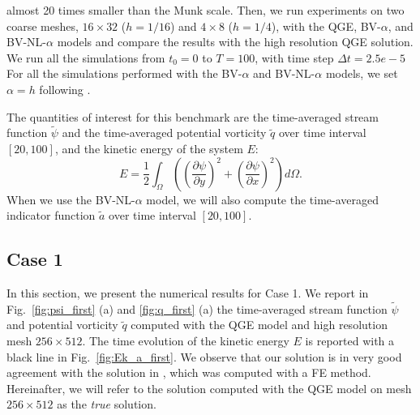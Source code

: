 \documentclass[11pt,a4paper]{article}
\begin{document}
almost 20 times smaller than the Munk scale. Then, we run experiments on two coarse meshes, 
$16 \times 32$ ($h = 1/16$) and $4 \times 8$ ($h = 1/4$), with the QGE, BV-$\alpha$, and BV-NL-$\alpha$ models and 
compare the results with the high resolution QGE solution. %
We run all the simulations from $t_0 = 0$ to $T = 100$, with time step $\Delta t = 2.5e-5$ \cite{San2014}
For all the simulations performed with the BV-$\alpha$ and BV-NL-$\alpha$ models, we  
set $\alpha = h$ following \cite{Holm2003}.

The quantities of interest for this benchmark are the time-averaged stream function $\widetilde{\psi}$
and the time-averaged potential vorticity $\widetilde{q}$ over time interval $[20,100]$, and 
the kinetic energy of the system $E$:
\begin{equation}
E = \dfrac{1}{2}\int_\Omega  \left( \left(\dfrac{\partial \psi}{\partial y}\right)^2 + \left(\dfrac{\partial \psi}{\partial x}\right)^2 \right)d\Omega.
\end{equation}\label{eq:kin_energy}
When we use the BV-NL-$\alpha$ model,
we will also compute the time-averaged indicator function $\widetilde{a}$ over time interval $[20,100]$.


\subsection{Case 1}

In this section, we present the numerical results for Case 1. 
We report in  Fig.~\ref{fig:psi_first} (a) and \ref{fig:q_first} (a) the time-averaged stream function 
$\widetilde{\psi}$ and potential vorticity $\widetilde{q}$ computed with the QGE model
and high resolution mesh $256 \times 512$.
The time evolution of the kinetic energy $E$ is reported with a black line in Fig.~\ref{fig:Ek_a_first}.
We observe that our solution %
is in very good agreement with the solution in \cite{San2011, San2014}, which was computed
with a FE method. %
Hereinafter, we will refer to the solution computed with the QGE model on mesh $256 \times 512$ as the \emph{true} solution.%
\end{document}
